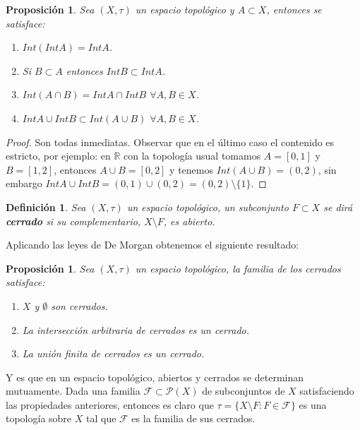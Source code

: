 \documentclass[12pt]{article}
\newtheorem{proposition}[theorem]{Proposición}
\newtheorem{definition}[theorem]{Definición}
\begin{document}
\begin{proposition}Sea $(X, \tau)$ un espacio topológico y $A \subset X$, entonces se satisface:
\begin{enumerate}
\item $Int(Int A) = Int A$.
\item Si $B \subset A$ entonces $Int B \subset Int A$.
\item $Int (A \cap B) = Int A \cap Int B$ $\forall A,B \in X$.
\item $Int A \cup Int B \subset Int (A \cup B)$ $\forall A,B \in X$.
\end{enumerate}
\end{proposition}
\begin{proof}
Son todas inmediatas. Observar que en el último caso el contenido es estricto, por ejemplo: en $\mathbb{R}$ con la topología usual tomamos $A=[0,1]$ y $B = [1,2]$, entonces $A \cup B = [0,2]$ y tenemos $Int(A \cup B) = (0,2)$, sin embargo $Int A \cup Int B = (0,1) \cup (0,2) = (0,2) \setminus \lbrace 1 \rbrace.$

\end{proof}

\begin{definition}Sea $(X, \tau)$ un espacio topológico, un subconjunto $F \subset X$ se dirá \textbf{cerrado} si su complementario, $X \setminus F$, es abierto.
\end{definition}

Aplicando las leyes de De Morgan obtenemos el siguiente resultado: 

\begin{proposition}Sea $(X, \tau)$ un espacio topológico, la familia de los cerrados satisface:\begin{enumerate}
\item $X$ y $\emptyset$ son cerrados.
\item La intersección arbitraria de cerrados es un cerrado.
\item La unión finita de cerrados es un cerrado.
\end{enumerate}
\end{proposition}

Y es que en un espacio topológico, abiertos y cerrados se determinan mutuamente. Dada una familia $\mathcal{F} \subset \mathcal{P}(X)$ de subconjuntos de $X$ satisfaciendo las propiedades anteriores, entonces es claro que $\tau = \lbrace X \setminus F: F \in \mathcal{F} \rbrace$ es una topología sobre $X$ tal que $\mathcal{F}$ es la familia de sus cerrados.
\end{document}
